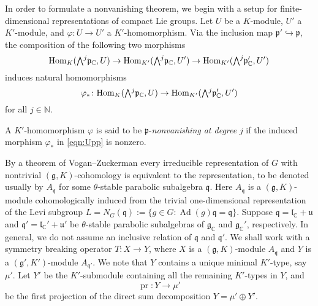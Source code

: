 In order to formulate a nonvanishing theorem, 
 we begin with a setup 
 for finite-dimensional representations
 of compact Lie groups.  
Let $U$ be a $K$-module,
 $U'$ a $K'$-module,
 and $\varphi \colon U \to U'$ a $K'$-homomorphism.  
Via the inclusion map ${\mathfrak{p}}' \hookrightarrow {\mathfrak{p}}$, 
 the composition
 of the following two morphisms
\[
   {\operatorname{Hom}}_K(\Exterior^j {\mathfrak{p}}_{\mathbb{C}},U)
  \to 
   {\operatorname{Hom}}_{K'}(\Exterior^j {\mathfrak{p}}_{\mathbb{C}},U')
  \to
  {\operatorname{Hom}}_{K'}(\Exterior^j {\mathfrak{p}}_{\mathbb{C}}',U')
\]
 induces natural homomorphisms
\begin{equation}
\label{eqn:Upp}
  \varphi_{\ast} \colon 
  {\operatorname{Hom}}_K(\Exterior^j {\mathfrak{p}}_{\mathbb{C}},U)
  \to 
  {\operatorname{Hom}}_{K'}(\Exterior^j {\mathfrak{p}}_{\mathbb{C}}',U')
\end{equation}
for all $j \in {\mathbb{N}}$.  
\begin{definition}
\label{def:pnonvan}
A $K'$-homomorphism $\varphi$ is said to be ${\mathfrak{p}}$-{\it{nonvanishing
 at degree}} $j$
 if the induced morphism $\varphi_{\ast}$ in \eqref{eqn:Upp} is nonzero.  
\end{definition}



By a theorem of Vogan--Zuckerman \cite{VZ}
 every irreducible representation of $G$
 with nontrivial $({\mathfrak{g}},K)$-cohomology is equivalent
 to the representation, 
 to be denoted usually by $A_{\mathfrak{q}}$ 
 for some $\theta$-stable parabolic subalgebra ${\mathfrak {q}}$.  
Here $A_{\mathfrak{q}}$ is a $({\mathfrak {g}},K)$-module cohomologically
 induced from the trivial one-dimensional representation
 of the Levi subgroup $L=N_{G}({\mathfrak{q}}):=\{g \in G : {\operatorname{Ad}}(g){\mathfrak{q}}={\mathfrak{q}}\}$.  
Suppose ${\mathfrak{q}}={\mathfrak{l}}_{\mathbb{C}}+{\mathfrak{u}}$
 and ${\mathfrak{q}}'={\mathfrak{l}}_{\mathbb{C}}'+{\mathfrak{u}}'$
 be $\theta$-stable parabolic subalgebras
 of ${\mathfrak{g}}_{\mathbb{C}}$ and ${\mathfrak{g}}_{\mathbb{C}}'$, 
 respectively.  
In general, 
 we do not assume an inclusive relation
 of ${\mathfrak{q}}$ and ${\mathfrak{q}}'$.  
We shall work
 with a symmetry breaking operator $T \colon X \to Y$, 
 where $X$ is a $({\mathfrak{g}},K)$-module
 $A_{\mathfrak{q}}$ and $Y$ is a $({\mathfrak{g}}',K')$-module
 $A_{\mathfrak{q}'}$.  
We note that $Y$ contains a unique minimal $K'$-type,
 say $\mu'$.  
Let $Y'$ be the $K'$-submodule
 containing all the remaining $K'$-types in $Y$, 
 and 
\[
  {\operatorname{pr}} \colon Y \to \mu'
\] 
 be the first projection
 of the direct sum decomposition
 $Y= \mu' \oplus Y'$.  

